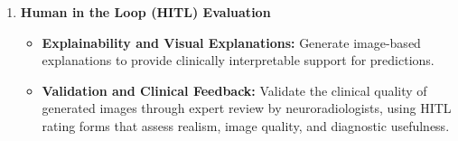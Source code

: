 \begin{enumerate}
\begin{itemize}
        \item \textbf{e4e Latent Inversion:} Integrate and train an e4e encoder to invert MRI slices into latent space.

    \end{itemize}

    \item \textbf{Human in the Loop (HITL) Evaluation}
    \begin{itemize}
        \item \textbf{Explainability and Visual Explanations:}  Generate image-based explanations to provide clinically interpretable support for predictions.

        \item \textbf{Validation and Clinical Feedback:} Validate the clinical quality of generated images through expert review by neuroradiologists, using HITL rating forms that assess realism, image quality, and diagnostic usefulness.


    \end{itemize}
\end{enumerate}
